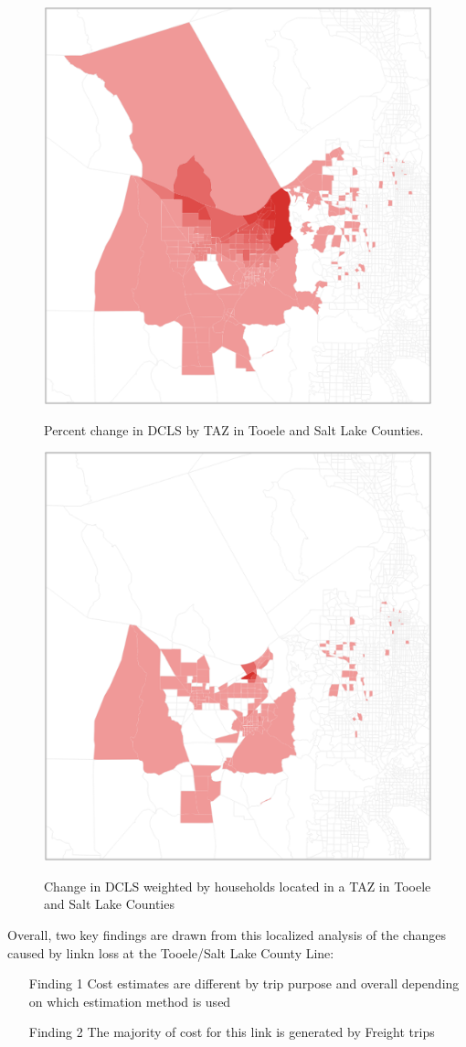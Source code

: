 \begin{figure}[H]
\begin{center}
{\centering \includegraphics[width=0.50\linewidth]{figures/chapter4/percentchangechoropleth.png}}

\caption{Percent change in DCLS by TAZ in Tooele and Salt Lake Counties.}
\label{fig:percentchangemap}
\end{center}
\end{figure}

\begin{figure}[H]
  \squeezeup
\begin{center}
{\centering \includegraphics[width=0.50\linewidth]{figures/chapter4/populationweightedchangechoropleth.png}}

\caption{Change in DCLS weighted by households located in a TAZ in Tooele and Salt Lake Counties}
\label{fig:hhmap}
\end{center}
\end{figure}

\squeezeup
\squeezeup
\squeezeup
\squeezeup
\squeezeup
\pagebreak
Overall, two key findings are drawn from this localized analysis of the changes caused by linkn loss at the Tooele/Salt Lake County Line:
\begin{itemize}
  \item [Finding 1]{Cost estimates are different by trip purpose and overall depending on
  which estimation method is used}
  \item [Finding 2]{The majority of cost for this link is generated by Freight trips}
\end{itemize}

